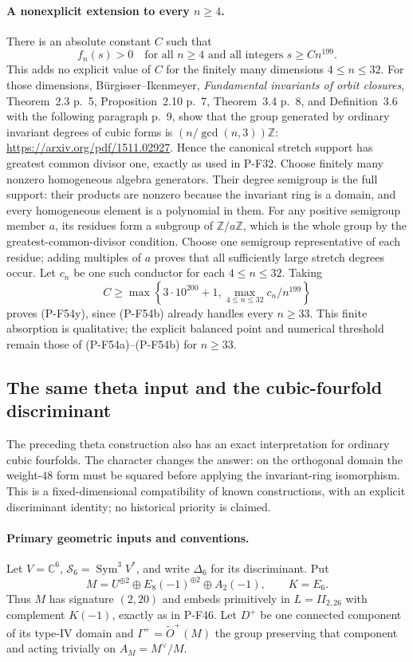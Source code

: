 \documentclass[11pt,a4paper]{article}
\begin{document}
\paragraph{A nonexplicit extension to every $n\ge4$.}
There is an absolute constant $C$ such that
\[
                f_n(s)>0\quad
       \text{for all }n\ge4\text{ and all integers }s\ge Cn^{199}.
                                                               \tag{P-F54y}
\]
This adds no explicit value of $C$ for the finitely many
dimensions $4\le n\le32$.
For those dimensions, B\"urgisser--Ikenmeyer,
\emph{Fundamental invariants of orbit closures},
Theorem~2.3 p.~5, Proposition~2.10 p.~7, Theorem~3.4 p.~8,
and Definition~3.6 with the following paragraph p.~9,
show that the group generated by ordinary invariant
degrees of cubic forms is $(n/\gcd(n,3))\mathbb Z$:
\url{https://arxiv.org/pdf/1511.02927}.
Hence the canonical stretch support has greatest common
divisor one, exactly as used in P-F32.
Choose finitely many nonzero homogeneous algebra generators.
Their degree semigroup is the full support: their products
are nonzero because the invariant ring is a domain, and
every homogeneous element is a polynomial in them.
For any positive semigroup member $a$, its residues form
a subgroup of $\mathbb Z/a\mathbb Z$, which is the whole
group by the greatest-common-divisor condition.
Choose one semigroup representative of each residue;
adding multiples of $a$ proves that all sufficiently
large stretch degrees occur. Let $c_n$ be one such
conductor for each $4\le n\le32$.
Taking
\[
 C\ge\max\left\{3\cdot10^{200}+1,
             \max_{4\le n\le32}c_n/n^{199}\right\}
\]
proves (P-F54y), since (P-F54b) already handles every
$n\ge33$. This finite absorption is qualitative; the
explicit balanced point and numerical threshold remain
those of (P-F54a)--(P-F54b) for $n\ge33$.


\subsection{The same theta input and the cubic-fourfold discriminant}

The preceding theta construction also has an exact interpretation for
ordinary cubic fourfolds. The character changes the answer: on the
orthogonal domain the weight-$48$ form must be squared before applying
the invariant-ring isomorphism. This is a fixed-dimensional
compatibility of known constructions, with an explicit discriminant
identity; no historical priority is claimed.

\paragraph{Primary geometric inputs and conventions.}
Let $V=\mathbb C^6$, $\mathscr S_6=\operatorname{Sym}^3V^*$,
and write $\Delta_6$ for its discriminant. Put
\[
 M=U^{\oplus2}\oplus E_8(-1)^{\oplus2}\oplus A_2(-1),
 \qquad K=E_6.
\]
Thus $M$ has signature $(2,20)$ and embeds primitively in
$L=II_{2,26}$ with complement $K(-1)$, exactly as in P-F46.
Let $D^+$ be one connected component of its type-IV domain and
$\Gamma^+=\widetilde O^+(M)$ the group preserving that component
and acting trivially on $A_M=M^\vee/M$.
\end{document}
